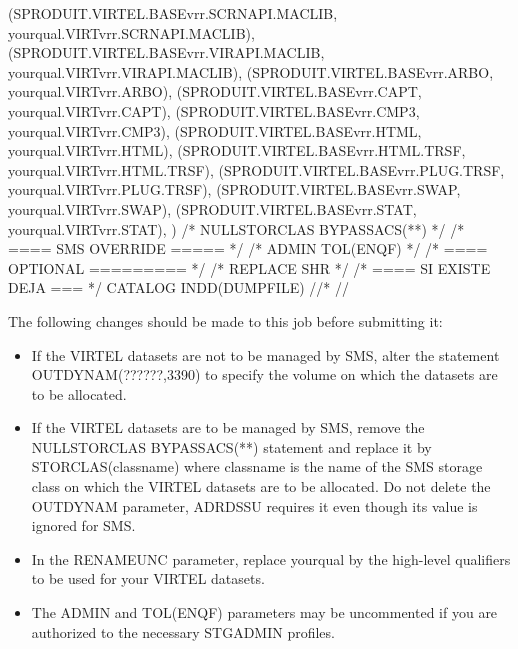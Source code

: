 \documentclass[letterpaper,10pt,english]{sphinxmanual}
\begin{document}
\begin{sphinxVerbatim}[commandchars=\\\{\}]
    (SPRODUIT.VIRTEL.BASEvrr.SCRNAPI.MACLIB, \PYGZhy{}
            yourqual.VIRTvrr.SCRNAPI.MACLIB), \PYGZhy{}
    (SPRODUIT.VIRTEL.BASEvrr.VIRAPI.MACLIB, \PYGZhy{}
            yourqual.VIRTvrr.VIRAPI.MACLIB), \PYGZhy{}
    (SPRODUIT.VIRTEL.BASEvrr.ARBO, \PYGZhy{}
            yourqual.VIRTvrr.ARBO), \PYGZhy{}
    (SPRODUIT.VIRTEL.BASEvrr.CAPT, \PYGZhy{}
            yourqual.VIRTvrr.CAPT), \PYGZhy{}
    (SPRODUIT.VIRTEL.BASEvrr.CMP3, \PYGZhy{}
            yourqual.VIRTvrr.CMP3), \PYGZhy{}
    (SPRODUIT.VIRTEL.BASEvrr.HTML, \PYGZhy{}
            yourqual.VIRTvrr.HTML), \PYGZhy{}
    (SPRODUIT.VIRTEL.BASEvrr.HTML.TRSF, \PYGZhy{}
            yourqual.VIRTvrr.HTML.TRSF), \PYGZhy{}
    (SPRODUIT.VIRTEL.BASEvrr.PLUG.TRSF, \PYGZhy{}
            yourqual.VIRTvrr.PLUG.TRSF), \PYGZhy{}
            (SPRODUIT.VIRTEL.BASEvrr.SWAP, \PYGZhy{}
                    yourqual.VIRTvrr.SWAP), \PYGZhy{}
            (SPRODUIT.VIRTEL.BASEvrr.STAT, \PYGZhy{}
                    yourqual.VIRTvrr.STAT), \PYGZhy{}
                    ) \textendash{}
    /* NULLSTORCLAS BYPASSACS(**) */ /* \PYGZlt{}==== SMS OVERRIDE ===== */ \PYGZhy{}
    /* ADMIN TOL(ENQF) */                    /* \PYGZlt{}==== OPTIONAL ========= */ \PYGZhy{}
    /* REPLACE SHR */                                /* \PYGZlt{}==== SI EXISTE DEJA === */ \PYGZhy{}
            CATALOG INDD(DUMPFILE)
    //*
    //
\end{sphinxVerbatim}


The following changes should be made to this job before submitting it:
\begin{itemize}
\item {} 
If the VIRTEL datasets are not to be managed by SMS, alter the statement OUTDYNAM(??????,3390) to specify the volume on which the datasets are to be allocated.

\item {} 
If the VIRTEL datasets are to be managed by SMS, remove the NULLSTORCLAS BYPASSACS(**) statement and replace it by STORCLAS(classname) where classname is the name of the SMS storage class on which the VIRTEL datasets are to be allocated. Do not delete the OUTDYNAM parameter, ADRDSSU requires it even though its value is ignored for SMS.

\item {} 
In the RENAMEUNC parameter, replace yourqual by the high-level qualifiers to be used for your VIRTEL datasets.

\item {} 
The ADMIN and TOL(ENQF) parameters may be uncommented if you are authorized to the necessary STGADMIN profiles.

\end{itemize}
\end{document}
